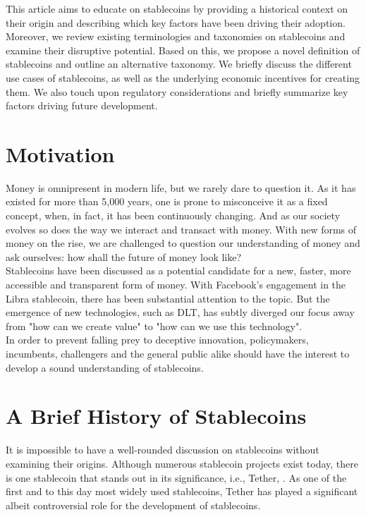 \documentclass[conference]{IEEEtran}
\begin{document}
This article aims to educate on stablecoins by providing a historical context on their origin and describing  which key factors have been driving their adoption. Moreover, we review existing terminologies and taxonomies on stablecoins and examine their disruptive potential. Based on this, we propose a novel definition of stablecoins and outline an alternative taxonomy. We briefly discuss the different use cases of stablecoins, as well as the underlying economic incentives for creating them. We also touch upon regulatory considerations and briefly summarize key factors driving future development.

\section{Motivation}
Money is omnipresent in modern life, but we rarely dare to question it. As it has existed for more than 5,000 years, one is prone to misconceive it as a fixed concept, when, in fact, it has been continuously changing. And as our society evolves so does the way we interact and transact with money. With new forms of money on the rise, we are challenged to question our understanding of money and ask ourselves: how shall the future of money look like?\\

Stablecoins have been discussed as a potential candidate for a new, faster, more accessible and transparent form of money. With Facebook's engagement in the Libra stablecoin, there has been substantial attention to the topic. But the emergence of new technologies, such as \ac{DLT}, has subtly diverged our focus away from "how can we create value" to "how can we use this technology".\\

In order to prevent falling prey to deceptive innovation, policymakers, incumbents, challengers and the general public alike should have the interest to develop a sound understanding of stablecoins. 

\section{A Brief History of Stablecoins}
\label{sec:history}
It is impossible to have a well-rounded discussion on stablecoins without examining their origins. Although numerous stablecoin projects exist today, there is one stablecoin that stands out in its significance, i.e., Tether, \cite{Consensys}. As one of the first and to this day most widely used stablecoins, Tether has played a significant albeit controversial role for the development of stablecoins.\\
\end{document}
